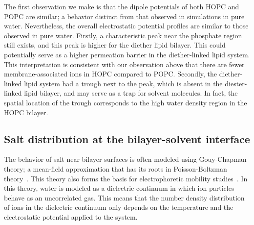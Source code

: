 \documentclass[12pt,openany,final]{book}
\begin{document}
The first observation we make is that the 
dipole potentials of both HOPC and POPC are similar; a behavior distinct from that 
observed in simulations in pure water. Nevertheless, the overall electrostatic potential 
profiles are similar to those observed in pure water. Firstly, a characteristic peak near the 
phosphate region still exists, and this peak is higher for the diether lipid bilayer. This could potentially 
serve as a higher permeation barrier in the diether-linked lipid system. This interpretation is consistent with our 
observation above that there are fewer membrane-associated ions in HOPC compared to POPC. Secondly, the 
diether-linked lipid system had a trough next to the peak, which is absent in the diester-linked lipid bilayer, and 
may serve as a trap for solvent molecules. In fact, the spatial location of the trough corresponds to the high water density region in the HOPC bilayer.



\subsection{Salt distribution at the bilayer-solvent interface}
\vspace{-0.3cm}
The behavior of salt near bilayer surfaces is often modeled using Gouy-Chapman theory; 
a mean-field approximation that has its roots in Poisson-Boltzman theory~\cite{israelachvili:2011:intermol,wiersema:1966}. 
This theory also forms the basis for electrophoretic mobility studies~\cite{wiersema:1966,o:1978:electrophoretic}. 
In this theory, water is modeled as 
a dielectric continuum in which ion particles behave as an uncorrelated gas. This means that the number density distribution of ions in the dielectric continuum only
depends on the temperature and the electrostatic potential applied to the system.
\end{document}
